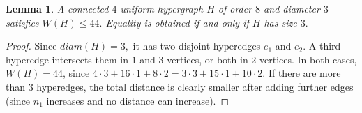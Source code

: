 \documentclass[a4paper,11pt]{article}
\newcommand*{\abs}[1]{\lvert #1\rvert}
\newcommand{\diam}{diam}
\newtheorem{lem}[defi]{Lemma}
\begin{document}
\begin{lem}\label{lem:Wle44}
    A connected $4$-uniform hypergraph $H$ of order $8$ and diameter $3$ satisfies $W(H) \le 44.$
    Equality is obtained if and only if $H$ has size $3.$
\end{lem}

\begin{proof}
    Since $\diam(H)=3,$ it has two disjoint hyperedges $e_1$ and $e_2$.
    A third hyperedge intersects them in $1$ and $3$ vertices, or both in $2$ vertices.
    In both cases, $W(H)=44$, since $4 \cdot 3+ 16\cdot 1+ 8 \cdot 2=3 \cdot 3+ 15\cdot 1+ 10 \cdot 2$.
    If there are more than $3$ hyperedges, the total distance is clearly smaller after adding further edges (since $n_1$ increases and no distance can increase).
\end{proof}






\end{document}
